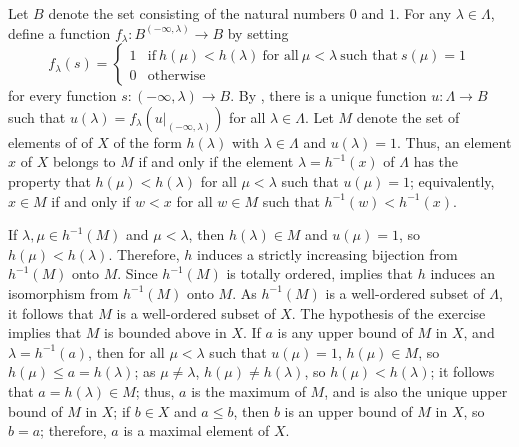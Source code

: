 \documentclass{article}
\begin{document}
\begin{solution}[\ref{exe:5qa65h5w}]
  \label{sol:s0vlfhkj}
  Let \(B\) denote the set consisting of the natural numbers \(0\) and
  \(1\).  For any \(\lambda \in \Lambda\), define a function
  \(f_\lambda : B^{(-\infty, \lambda)} \to B\) by setting
  \begin{displaymath}
    f_\lambda(s) =
    \begin{cases}
      1
      & \text{if} ~ h(\mu) < h(\lambda) ~ \text{for all}
        ~ \mu < \lambda ~ \text{such that} ~ s(\mu) = 1 \\
      0
      & \text{otherwise}
    \end{cases}
  \end{displaymath}
  for every function \(s : (-\infty, \lambda) \to B\).  By
  , there is a unique function
  \(u : \Lambda \to B\) such that
  \(u(\lambda) = f_\lambda(u \vert_{(-\infty, \lambda)})\) for all
  \(\lambda \in \Lambda\).  Let \(M\) denote the set of elements of of
  \(X\) of the form \(h(\lambda)\) with \(\lambda \in \Lambda\) and
  \(u(\lambda) = 1\).  Thus, an element \(x\) of \(X\) belongs to
  \(M\) if and only if the element \(\lambda = h^{-1}(x)\) of
  \(\Lambda\) has the property that \(h(\mu) < h(\lambda)\) for all
  \(\mu < \lambda\) such that \(u(\mu) = 1\); equivalently,
  \(x \in M\) if and only if \(w < x\) for all \(w \in M\) such that
  \(h^{-1}(w) < h^{-1}(x)\).

  If \(\lambda,\mu \in h^{-1}(M)\) and \(\mu < \lambda\), then
  \(h(\lambda) \in M\) and \(u(\mu) = 1\), so \(h(\mu) < h(\lambda)\).
  Therefore, \(h\) induces a strictly increasing bijection from
  \(h^{-1}(M)\) onto \(M\).  Since \(h^{-1}(M)\) is totally ordered,
   implies that \(h\) induces an isomorphism from
  \(h^{-1}(M)\) onto \(M\).  As \(h^{-1}(M)\) is a well-ordered subset
  of \(\Lambda\), it follows that \(M\) is a well-ordered subset of
  \(X\).  The hypothesis of the exercise implies that \(M\) is bounded
  above in \(X\).  If \(a\) is any upper bound of \(M\) in \(X\), and
  \(\lambda = h^{-1}(a)\), then for all \(\mu < \lambda\) such that
  \(u(\mu) = 1\), \(h(\mu) \in M\), so \(h(\mu) \leq a = h(\lambda)\);
  as \(\mu \neq \lambda\), \(h(\mu) \neq h(\lambda)\), so
  \(h(\mu) < h(\lambda)\); it follows that \(a = h(\lambda) \in M\);
  thus, \(a\) is the maximum of \(M\), and is also the unique upper
  bound of \(M\) in \(X\); if \(b \in X\) and \(a \leq b\), then \(b\)
  is an upper bound of \(M\) in \(X\), so \(b = a\); therefore, \(a\)
  is a maximal element of \(X\).
\end{solution}
\end{document}
